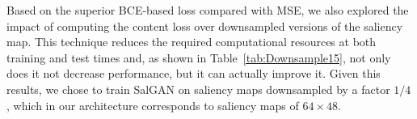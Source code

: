 \documentclass[times,twocolumn,final,authoryear]{elsarticle}
\begin{document}
Based on the superior BCE-based loss compared with MSE, we also explored the impact of computing the content loss over downsampled versions of the saliency map.
This technique reduces the required computational resources at both training and test times and, as shown in Table~\ref{tab:Downsample15}, not only does it not decrease performance, but it can actually improve it.
Given this results, we chose to train SalGAN on saliency maps downsampled by a factor $1/4$, which in our architecture corresponds to saliency maps of $64 \times 48$.







\end{document}
